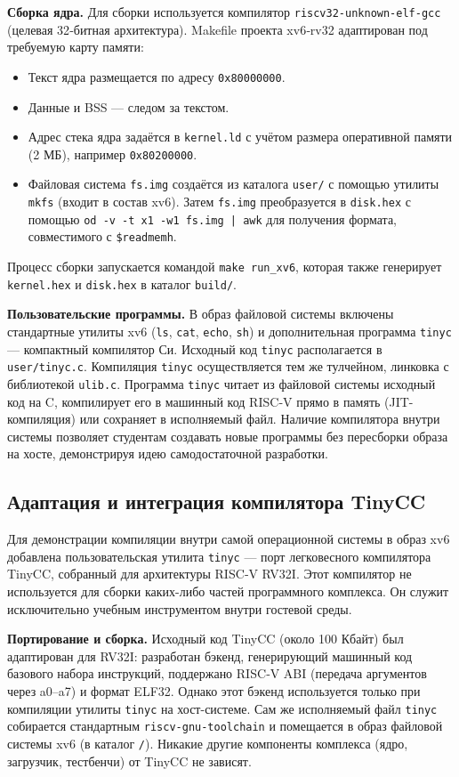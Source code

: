 \textbf{Сборка ядра.} Для сборки используется компилятор \texttt{riscv32-unknown-elf-gcc} (целевая 32‑битная архитектура). Makefile проекта xv6‑rv32 адаптирован под требуемую карту памяти:
\begin{itemize}
  \item Текст ядра размещается по адресу \texttt{0x80000000}.
  \item Данные и BSS — следом за текстом.
  \item Адрес стека ядра задаётся в \texttt{kernel.ld} с учётом размера оперативной памяти (2 МБ), например \texttt{0x80200000}.
  \item Файловая система \texttt{fs.img} создаётся из каталога \texttt{user/} с помощью утилиты \texttt{mkfs} (входит в состав xv6). Затем \texttt{fs.img} преобразуется в \texttt{disk.hex} с помощью \texttt{od -v -t x1 -w1 fs.img | awk} для получения формата, совместимого с \texttt{\$readmemh}.
\end{itemize}
Процесс сборки запускается командой \texttt{make run\_xv6}, которая также генерирует \texttt{kernel.hex} и \texttt{disk.hex} в каталог \texttt{build/}. 

\textbf{Пользовательские программы.} В образ файловой системы включены стандартные утилиты xv6 (\texttt{ls}, \texttt{cat}, \texttt{echo}, \texttt{sh}) и дополнительная программа \texttt{tinyc} — компактный компилятор Си. Исходный код \texttt{tinyc} располагается в \texttt{user/tinyc.c}. Компиляция \texttt{tinyc} осуществляется тем же тулчейном, линковка с библиотекой \texttt{ulib.c}. Программа \texttt{tinyc} читает из файловой системы исходный код на C, компилирует его в машинный код RISC‑V прямо в память (JIT-компиляция) или сохраняет в исполняемый файл. Наличие компилятора внутри системы позволяет студентам создавать новые программы без пересборки образа на хосте, демонстрируя идею самодостаточной разработки.

\subsection{Адаптация и интеграция компилятора TinyCC}

Для демонстрации компиляции внутри самой операционной системы в образ xv6 добавлена пользовательская утилита \texttt{tinyc} — порт легковесного компилятора TinyCC, собранный для архитектуры RISC‑V RV32I. Этот компилятор не используется для сборки каких-либо частей программного комплекса. Он служит исключительно учебным инструментом внутри гостевой среды.

\textbf{Портирование и сборка.} Исходный код TinyCC (около 100 Кбайт) был адаптирован для RV32I: разработан бэкенд, генерирующий машинный код базового набора инструкций, поддержано RISC‑V ABI (передача аргументов через a0–a7) и формат ELF32. Однако этот бэкенд используется только при компиляции утилиты \texttt{tinyc} на хост-системе. Сам же исполняемый файл \texttt{tinyc} собирается стандартным \texttt{riscv-gnu-toolchain} и помещается в образ файловой системы xv6 (в каталог \texttt{/}). Никакие другие компоненты комплекса (ядро, загрузчик, тестбенчи) от TinyCC не зависят.


